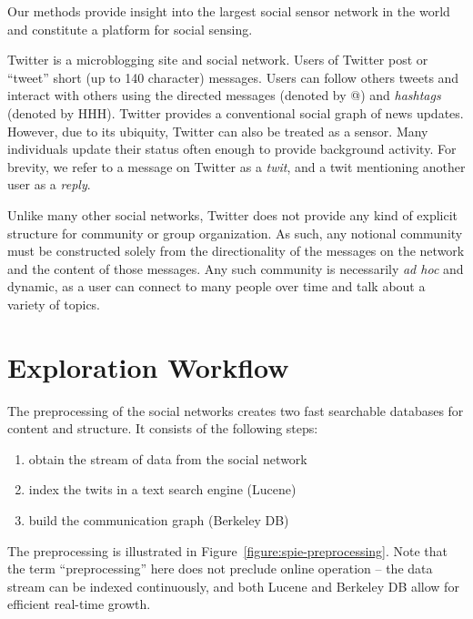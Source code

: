 \documentclass[10pt,oneside]{memoir}
\begin{document}
Our methods provide insight into the largest social sensor network in the world and constitute a platform for social sensing.


Twitter is a microblogging site and social network. Users of
Twitter post or ``tweet'' short (up to 140 character) messages. Users
can follow others tweets and interact with others using the
directed messages (denoted by @) and {\itshape hashtags} (denoted by HHH).
Twitter provides a conventional social graph of news updates.
However, due to its ubiquity, Twitter can also be treated as a
sensor. Many individuals update their status often enough to
provide background activity. For brevity, we refer to a message on
Twitter as a {\itshape twit}, and a twit mentioning another user as a
{\itshape reply}.


Unlike many other social networks, Twitter does not provide any
kind of explicit structure for community or group organization. As
such, any notional community must be constructed solely from the
directionality of the messages on the network and the content of
those messages. Any such community is necessarily {\itshape ad hoc} and
dynamic, as a user can connect to many people over time and talk
about a variety of topics.


\pagebreak \section{Exploration Workflow}
\label{explorationworkflow}

The preprocessing of the social networks creates two fast
searchable databases for content and structure. It consists of the
following steps:


\begin{enumerate}


\item obtain the stream of data from the social network




\item index the twits in a text search engine (Lucene)




\item build the communication graph (Berkeley DB)



\end{enumerate}

The preprocessing is illustrated in Figure~\ref{figure:spie-preprocessing}.
Note that the term ``preprocessing'' here does not preclude online
operation -- the data stream can be indexed continuously, and both
Lucene and Berkeley DB allow for efficient real-time growth.
\end{document}
